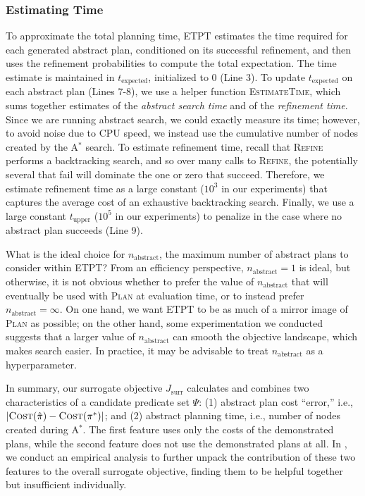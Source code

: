 \subsubsection{Estimating Time}
To approximate the total planning time, ETPT estimates the time required for each generated abstract plan, conditioned on its successful refinement, and then uses the refinement probabilities to compute the total expectation.
The time estimate is maintained in $t_\text{expected}$, initialized to 0 (Line 3).
To update $t_\text{expected}$ on each abstract plan (Lines 7-8), we use a helper function \textsc{EstimateTime}, which sums together estimates of the \emph{abstract search time} and of the \emph{refinement time}.
Since we are running abstract search, we could exactly measure its time; however, to avoid noise due to CPU speed, we instead use the cumulative number of nodes created by the A$^*$ search.
To estimate refinement time, recall that \textsc{Refine} performs a backtracking search, and so over many calls to \textsc{Refine}, the potentially several that fail will dominate the one or zero that succeed. Therefore, we estimate refinement time as a large constant ($10^3$ in our experiments) that captures the average cost of an exhaustive backtracking search.
Finally, we use a large constant $t_{\text{upper}}$ ($10^5$ in our experiments) to penalize in the case where no abstract plan succeeds (Line 9).

What is the ideal choice for $n_{\text{abstract}}$, the maximum number of abstract plans to consider within \textsc{ETPT}?
From an efficiency perspective, $n_{\text{abstract}}=1$ is ideal, but otherwise, it is not obvious whether to prefer the value of $n_{\text{abstract}}$ that will eventually be used with \textsc{Plan} at evaluation time, or to instead prefer $n_{\text{abstract}}=\infty$.
On one hand, we want \textsc{ETPT} to be as much of a mirror image of \textsc{Plan} as possible; on the other hand, some experimentation we conducted suggests that a larger value of $n_{\text{abstract}}$ can smooth the objective landscape, which makes search easier.
In practice, it may be advisable to treat $n_{\text{abstract}}$ as a hyperparameter.


In summary, our surrogate objective $J_{\text{surr}}$ calculates and combines two characteristics of a candidate predicate set $\Psi$: (1) abstract plan cost ``error,'' i.e., $|\textsc{Cost}(\hat{\pi}) - \textsc{Cost}(\pi^*)|$; and (2) abstract planning time, i.e., number of nodes created during A$^*$.
The first feature uses only the costs of the demonstrated plans, while the second feature does not use the demonstrated plans at all.
In , we conduct an empirical analysis to further unpack the contribution of these two features to the overall surrogate objective, finding them to be helpful together but insufficient  individually.

